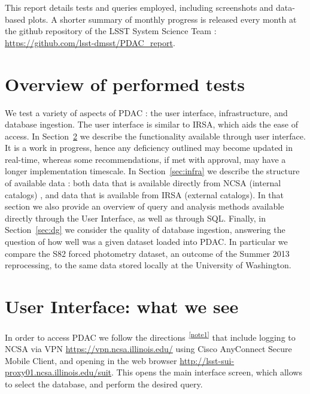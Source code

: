 \documentclass[DM,lsstdraft,toc,usenatbib]{lsstdoc}
\begin{document}
This report details tests and queries employed, including screenshots and data-based plots.  A shorter summary of monthly progress is released every month at the github repository of the LSST System Science Team : \url{https://github.com/lsst-dmsst/PDAC_report}. 

\section{Overview of performed tests}

We test a variety of aspects of PDAC : the user interface, infrastructure, and database ingestion.  The user interface is similar to IRSA, which aids the ease of access. In Section~\ref{sec:ui} we describe the functionality available through user interface. It is a work in progress, hence any deficiency outlined may become updated in real-time, whereas some recommendations, if met with approval, may have a longer implementation timescale. In Section~\ref{sec:infra} we describe the structure of  available data : both data that is available directly from NCSA (internal catalogs) , and data that is available from IRSA (external catalogs).  In that section we also provide an overview of query and analysis methods available directly through the User Interface,  as well as through SQL.  Finally, in Section~\ref{sec:dg} we consider the quality of database ingestion, answering the question of how well was a given dataset loaded into PDAC. In particular we compare the S82 forced photometry dataset, an outcome of the Summer 2013 reprocessing, to the same data stored locally at the University of Washington. 



\section{User Interface: what we see}
\label{sec:ui}

In order to access PDAC we 	follow the directions\textsuperscript{~\ref{note1}} that include logging to NCSA via VPN \url{https://vpn.ncsa.illinois.edu/} using Cisco AnyConnect Secure Mobile Client, and opening in the web browser \url{http://lsst-sui-proxy01.ncsa.illinois.edu/suit}. This opens the main interface screen, which allows to select the database, and perform the desired query. 
\end{document}
